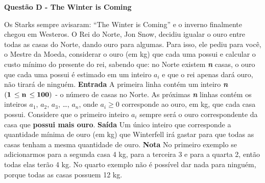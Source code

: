 \documentclass[a4paper, 12pt]{article}
\begin{document}
\newpage %
\begin{center}
\textbf{{\Large Questão D - The Winter is Coming}}
\end{center}
\vspace{5pt}
Os Starks sempre avisaram: ``The Winter is Coming'' e o inverno finalmente chegou em Westeros. O Rei do Norte, Jon Snow, decidiu igualar o ouro entre todas as casas do Norte, dando ouro para algumas. Para isso, ele pediu para você, o Mestre da Moeda, considerar o ouro (em kg) que cada uma possui e calcular o custo mínimo do presente do rei, sabendo que: no Norte existem \textbf{\textit{n}} casas, o ouro que cada uma possui é estimado em um inteiro $a_i$ e que o rei apenas dará ouro, não tirará de ninguém.
\newline \newline
\textbf{{\large Entrada}} \newline
A primeira linha contém um inteiro \textbf{\textit{n}}
 $(\textrm{\textbf{1}}\, \leq \textrm{\textbf{n}}\, \leq \textrm{\textbf{100}})$ - o número de casas no Norte.
As próximas \textbf{\textit{n}} linhas contém os inteiros $a_1$, $a_2$, $a_3$, \dots, $a_n$, onde 
$a_i \geq 0$ corresponde ao ouro, em kg, que cada casa possui. Considere que o primeiro inteiro $a_i$ sempre será o ouro correspondente da casa que \textbf{possui mais ouro}.
\newline \newline
\textbf{{\large Saída}} \newline
Um único inteiro que corresponde a quantidade mínima de ouro (em kg) que Winterfell irá gastar para que todas as casas tenham a mesma quantidade de ouro.
\newline \newline
\textbf{{\large Nota}} \newline
No primeiro exemplo se adicionarmos para a segunda casa 4 kg, para a terceira 3 e para a quarta 2, então todas elas terão 4 kg. \newline
No quarto exemplo não é possível dar nada para ninguém, porque todas as casas possuem 12 kg.
\end{document}
